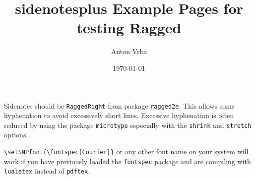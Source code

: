 \documentclass[twoside,10pt,ragged]{article}
\title{\textbf{\textsf{sidenotesplus}} Example Pages for testing Ragged}
\author{Anton Vrba}
\date{\today}
\begin{document}
\maketitle

Sidenotes should be \verb|RaggedRight| from package \verb|ragged2e|.
This allows some hyphenation to avoid excessively short lines.
Excessive hyphenation is often reduced by using the package \verb|microtype|
especially with the \verb|shrink| and \verb|stretch| options.

\bigbreak

\lipsum[1]\sidenote{\lipsum[2]}

\lipsum[3]\setSNPfont{\ttfamily}\sidenote{\lipsum[4]}

\bigbreak
\verb|\setSNPfont{\fontspec{Courier}}| or any other font name on your system
will work if you have previously loaded the \verb|fontspec| package and are
compiling with \verb|lualatex| instead of \verb|pdftex|.
\end{document}
